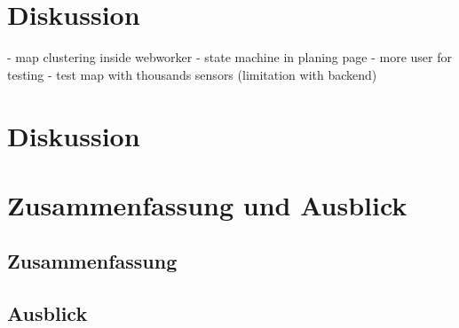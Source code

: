 





\chapter{Diskussion}

- map clustering inside webworker
- state machine in planing page
- more user for testing
- test map with thousands sensors (limitation with backend)

\chapter{Diskussion}

\chapter{Zusammenfassung und Ausblick}
\section{Zusammenfassung}
\section{Ausblick}
